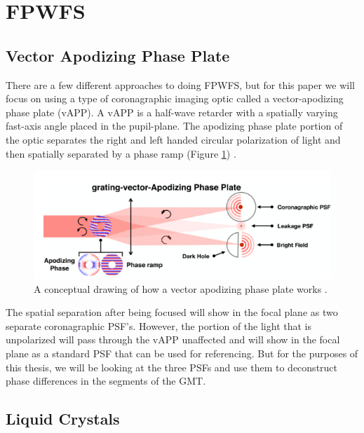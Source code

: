    

\section{FPWFS}
\label{sec:fpwfs}

\subsection{Vector Apodizing Phase Plate}
\label{sec:vAPP}

There are a few different approaches to doing FPWFS, but for this paper we will focus on using a type of coronagraphic imaging optic called a vector-apodizing phase plate (vAPP).  A vAPP is a half-wave retarder with a spatially varying fast-axis angle placed in the pupil-plane.  The apodizing phase plate portion of the optic separates the right and left handed circular polarization of light and then spatially separated by a phase ramp (Figure \ref{fig:vapp_concept}) \cite{Bos2019Focal-planePlate}.

\begin{figure}[H]
\centering
\includegraphics[width=14 cm]{Figures/vAPP.png}
\caption{A conceptual drawing of how a vector apodizing phase plate works \cite{Bos2019Focal-planePlate}.}
\label{fig:vapp_concept}
\end{figure}

The spatial separation after being focused will show in the focal plane as two separate coronagraphic PSF's.  However, the portion of the light that is unpolarized will pass through the vAPP unaffected and will show in the focal plane as a standard PSF that can be used for referencing.  But for the purposes of this thesis, we will be looking at the three PSFs and use them to deconstruct phase differences in the segments of the GMT.

\subsection{Liquid Crystals}
\label{sec:LC}

